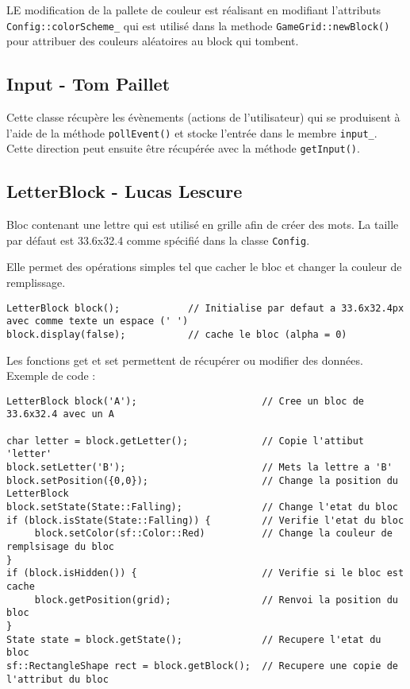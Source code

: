 \documentclass[11pt, openright]{book}
\begin{document}
     LE modification de la pallete de couleur est réalisant en modifiant l'attributs \texttt{Config::colorScheme\_} qui est utilisé dans la methode \texttt{GameGrid::newBlock()} pour attribuer des couleurs aléatoires au block qui tombent.

      \subsection{Input - Tom Paillet}
      
      Cette classe récupère les évènements (actions de l'utilisateur) qui se produisent 
    à l'aide de la méthode \texttt{pollEvent()} et stocke l'entrée dans le membre \texttt{input\_}. 
    Cette direction peut ensuite être récupérée avec la méthode \texttt{getInput()}.

     \subsection{LetterBlock - Lucas Lescure}

     Bloc contenant une lettre qui est utilisé en grille afin de créer des mots. La taille par défaut est 33.6x32.4 comme spécifié dans la classe \texttt{Config}.

     
    Elle permet des opérations simples tel que cacher le bloc et changer la couleur de remplissage.
     \begin{lstlisting}
LetterBlock block();            // Initialise par defaut a 33.6x32.4px avec comme texte un espace (' ')
block.display(false);           // cache le bloc (alpha = 0)
    \end{lstlisting}

    Les fonctions get et set permettent de récupérer ou modifier des données.\\
Exemple de code :
        \begin{lstlisting}
LetterBlock block('A');                      // Cree un bloc de 33.6x32.4 avec un A

char letter = block.getLetter();             // Copie l'attibut 'letter'
block.setLetter('B');                        // Mets la lettre a 'B'
block.setPosition({0,0});                    // Change la position du LetterBlock
block.setState(State::Falling);              // Change l'etat du bloc
if (block.isState(State::Falling)) {         // Verifie l'etat du bloc
     block.setColor(sf::Color::Red)          // Change la couleur de remplsisage du bloc
}
if (block.isHidden()) {                      // Verifie si le bloc est cache
     block.getPosition(grid);                // Renvoi la position du bloc
}
State state = block.getState();              // Recupere l'etat du bloc
sf::RectangleShape rect = block.getBlock();  // Recupere une copie de l'attribut du bloc
        \end{lstlisting}
\end{document}
